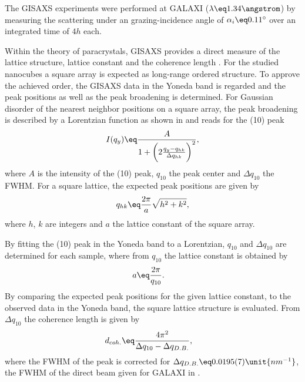 \documentclass[\main/dresen_thesis.tex]{subfiles}
\begin{document}
      The GISAXS experiments were performed at GALAXI ($\lambda \eq 1.34 \angstrom$) by measuring the scattering under an grazing-incidence angle of $\alpha_i \eq 0.11^\circ$ over an integrated time of $4 \unit{h}$ each.

      Within the theory of paracrystals, GISAXS provides a direct measure of the lattice structure, lattice constant and the coherence length \cite{Renaud_2009_Probi}.
      For the studied nanocubes a square array is expected as long-range ordered structure.
      To approve the achieved order, the GISAXS data in the Yoneda band is regarded and the peak positions as well as the peak broadening is determined.
      For Gaussian disorder of the nearest neighbor positions on a square array, the peak broadening is described by a Lorentzian function as shown in  and reads for the (10) peak
      \begin{align}
        I(q_y) \eq \frac{A} {1 + \biggl(2\frac{q_y - q_{hk}}{\Delta q_{hk}}\biggr)^2},
      \end{align}
      where $A$ is the intensity of the (10) peak, $q_{10}$ the peak center and $\Delta q_{10}$ the FWHM.
      For a square lattice, the expected peak positions are given by
      \begin{align}\label{eq:monolayers:preparation:solventVariation:squareLatticeIndices}
        q_{hk} \eq \frac{2 \pi}{a} \sqrt{h^2 + k^2},
      \end{align}
      where $h$, $k$ are integers and $a$ the lattice constant of the square array.

      By fitting the (10) peak in the Yoneda band to a Lorentzian, $q_{10}$ and $\Delta q_{10}$ are determined for each sample, where from $q_{10}$ the lattice constant is obtained by
      \begin{align}
        a &\eq \frac{2 \pi}{q_{10}}.
      \end{align}
      By comparing the expected peak positions for the given lattice constant, to the observed data in the Yoneda band, the square lattice structure is evaluated.
      From $\Delta q_{10}$ the coherence length is given by
      \begin{align}
        d_{coh.} &\eq \frac{4 \pi^2}{\Delta q_{10} - \Delta q_{D.B.}},
      \end{align}
      where the FWHM of the peak is corrected for $\Delta q_{D.B.} \eq 0.0195(7) \unit{nm^{-1}}$, the FWHM of the direct beam given for GALAXI in .
\end{document}
